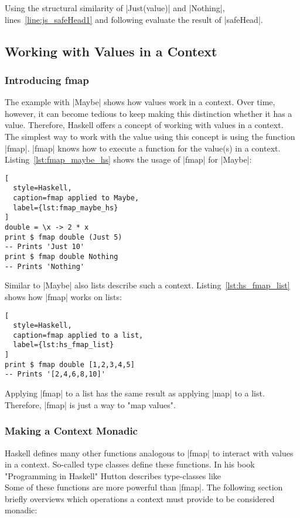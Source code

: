 Using the structural similarity of |Just(value)| and |Nothing|,
lines~\ref{line:js_safeHead1} and following evaluate the result of |safeHead|.

\subsection{Working with Values in a Context} %
\label{sub:Working with values in a context}
\subsubsection{Introducing fmap} %
\label{subsub:Introducing fmap}
The example with |Maybe| shows how values work in a context. Over time,
however, it can become tedious to keep making this distinction whether
it has a value. Therefore, Haskell offers a concept of working with values in a
context. The simplest way to work with the value using this concept is using
the function |fmap|. |fmap| knows how to execute a function for the value(s) in
a context. Listing~\ref{lst:fmap_maybe_hs} shows the usage of |fmap| for
|Maybe|:

\begin{lstlisting}[
  style=Haskell,
  caption=fmap applied to Maybe,
  label={lst:fmap_maybe_hs}
]
double = \x -> 2 * x
print $ fmap double (Just 5)
-- Prints 'Just 10' 
print $ fmap double Nothing
-- Prints 'Nothing'
\end{lstlisting}

Similar to |Maybe| also lists describe such a context.
Listing~\ref{lst:hs_fmap_list} shows how |fmap| works on lists:

\begin{lstlisting}[
  style=Haskell,
  caption=fmap applied to a list,
  label={lst:hs_fmap_list}
]
print $ fmap double [1,2,3,4,5]
-- Prints '[2,4,6,8,10]'
\end{lstlisting}

Applying |fmap| to a list has the same result as applying |map| to a list.
Therefore, |fmap| is just a way to "map values".

\subsubsection{Making a Context Monadic} %
\label{subsub:Making a Context Monadic}
Haskell defines many other functions analogous to |fmap| to interact with
values in a context. So-called type classes define these functions. In his book
"Programming in Haskell" Hutton describes type-classes like
\\ 
Some of these functions are more powerful than |fmap|. The following section
briefly overviews which operations a context must provide to be considered
monadic:

